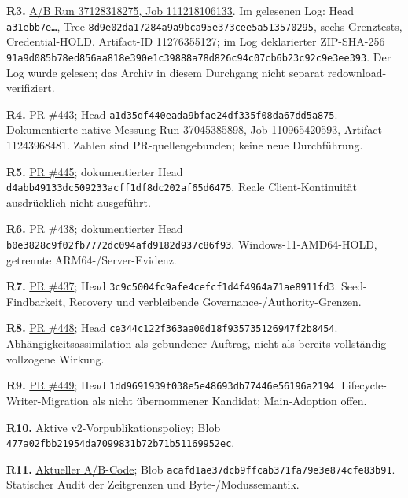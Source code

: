 \begin{cols}
\textbf{R3.} \href{https://github.com/ingolf-lohmann/qik-vrt/actions/runs/37128318275/job/111218106133}{A/B Run 37128318275, Job 111218106133}. Im gelesenen Log: Head \texttt{a31ebb7e…}, Tree \nolinkurl{8d9e02da17284a9a9bca95e373cee5a513570295}, sechs Grenztests, Credential-HOLD. Artifact-ID 11276355127; im Log deklarierter ZIP-SHA-256 \nolinkurl{91a9d085b78ed856aa818e390e1c39888a78d826c94c07cb6b23c92c9e3ee393}. Der Log wurde gelesen; das Archiv in diesem Durchgang nicht separat redownload-verifiziert.

\textbf{R4.} \href{https://github.com/ingolf-lohmann/qik-vrt/pull/443}{PR \#443}; Head \nolinkurl{a1d35df440eada9bfae24df335f08da67dd5a875}. Dokumentierte native Messung Run 37045385898, Job 110965420593, Artifact 11243968481. Zahlen sind PR-quellengebunden; keine neue Durchführung.

\textbf{R5.} \href{https://github.com/ingolf-lohmann/qik-vrt/pull/445}{PR \#445}; dokumentierter Head \nolinkurl{d4abb49133dc509233acff1df8dc202af65d6475}. Reale Client-Kontinuität ausdrücklich nicht ausgeführt.

\textbf{R6.} \href{https://github.com/ingolf-lohmann/qik-vrt/pull/438}{PR \#438}; dokumentierter Head \nolinkurl{b0e3828c9f02fb7772dc094afd9182d937c86f93}. Windows-11-AMD64-HOLD, getrennte ARM64-/Server-Evidenz.

\textbf{R7.} \href{https://github.com/ingolf-lohmann/qik-vrt/pull/437}{PR \#437}; Head \nolinkurl{3c9c5004fc9afe4cefcf1d4f4964a71ae8911fd3}. Seed-Findbarkeit, Recovery und verbleibende Governance-/Authority-Grenzen.

\textbf{R8.} \href{https://github.com/ingolf-lohmann/qik-vrt/pull/448}{PR \#448}; Head \nolinkurl{ce344c122f363aa00d18f935735126947f2b8454}. Abhängigkeitsassimilation als gebundener Auftrag, nicht als bereits vollständig vollzogene Wirkung.

\textbf{R9.} \href{https://github.com/ingolf-lohmann/qik-vrt/pull/449}{PR \#449}; Head \nolinkurl{1dd9691939f038e5e48693db77446e56196a2194}. Lifecycle-Writer-Migration als nicht übernommener Kandidat; Main-Adoption offen.

\textbf{R10.} \href{https://github.com/ingolf-lohmann/qik-vrt/blob/8153c4e69a6245aadf67f0741fb50d9707c19e34/policy/ZENODO_MACHINE_PROOF_BEFORE_PUBLICATION.md}{Aktive v2-Vorpublikationspolicy}; Blob \nolinkurl{477a02fbb21954da7099831b72b71b51169952ec}.

\textbf{R11.} \href{https://github.com/ingolf-lohmann/qik-vrt/blob/a31ebb7eb810334c4f00ebadd4604fa5cf45abea/tools/qikvrt_live_authority_mirror_ab.py}{Aktueller A/B-Code}; Blob \nolinkurl{acafd1ae37dcb9ffcab371fa79e3e874cfe83b91}. Statischer Audit der Zeitgrenzen und Byte-/Modussemantik.


\end{cols}

